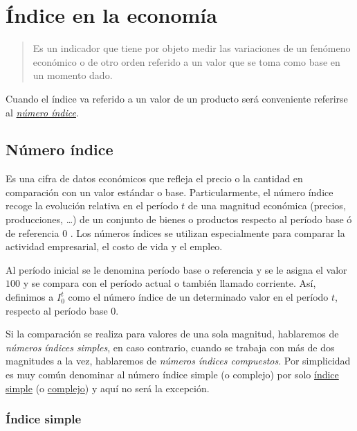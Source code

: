 \documentclass[
]{book}
\begin{document}
\hypertarget{uxedndice-en-la-economuxeda}{%
\section{Índice en la economía}\label{uxedndice-en-la-economuxeda}}

\begin{quote}
Es un indicador que tiene por objeto medir las variaciones de un fenómeno económico o de otro orden referido a un valor que se toma como base en un momento dado.
\end{quote}

Cuando el índice va referido a un valor de un producto será conveniente referirse al \protect\hyperlink{numeroindice}{\emph{número índice}}.

\hypertarget{numeroindice}{%
\subsection{Número índice}\label{numeroindice}}

Es una cifra de datos económicos que refleja el precio o la cantidad en comparación con un valor estándar o base. Particularmente, el número índice recoge la evolución relativa en el período \(t\) de una magnitud económica (precios, producciones, \ldots{}) de un conjunto de bienes o productos respecto al período base ó de referencia \(0\) \citep{fernandez2004introduccion}. Los números índices se utilizan especialmente para comparar la actividad empresarial, el costo de vida y el empleo.

Al período inicial se le denomina período base o referencia y se le asigna el valor \(100\) y se compara con el período actual o también llamado corriente. Así, definimos a \(I_{0}^{t}\) como el número índice de un determinado valor en el período \(t\), respecto al período base \(0\).

Si la comparación se realiza para valores de una sola magnitud, hablaremos de \emph{números índices simples}, en caso contrario, cuando se trabaja con más de dos magnitudes a la vez, hablaremos de \emph{números índices compuestos}. Por simplicidad es muy común denominar al número índice simple (o complejo) por solo \protect\hyperlink{indicesimple}{índice simple} (o \protect\hyperlink{indicecomplejo}{complejo}) y aquí no será la excepción.

\hypertarget{indicesimple}{%
\subsubsection{Índice simple}\label{indicesimple}}
\end{document}
